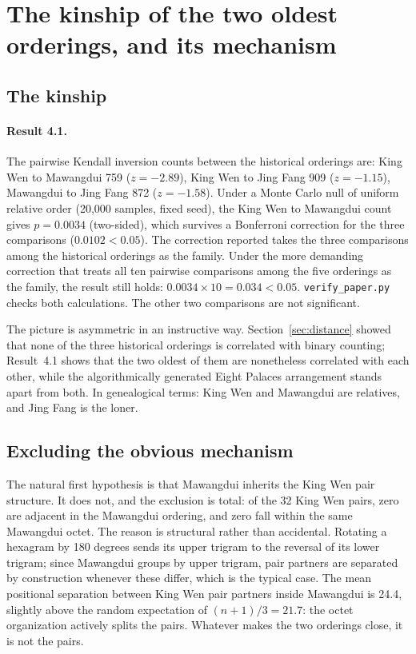 \documentclass[11pt]{article}
\begin{document}
\section{The kinship of the two oldest orderings, and its mechanism}
\label{sec:kinship}

\subsection{The kinship}

\paragraph{Result 4.1.} The pairwise Kendall inversion counts between the historical orderings are: King Wen to Mawangdui 759 ($z = -2.89$), King Wen to Jing Fang 909 ($z = -1.15$), Mawangdui to Jing Fang 872 ($z = -1.58$). Under a Monte Carlo null of uniform relative order (20,000 samples, fixed seed), the King Wen to Mawangdui count gives $p = 0.0034$ (two-sided), which survives a Bonferroni correction for the three comparisons ($0.0102 < 0.05$). The correction reported takes the three comparisons among the historical orderings as the family. Under the more demanding correction that treats all ten pairwise comparisons among the five orderings as the family, the result still holds: $0.0034 \times 10 = 0.034 < 0.05$. \texttt{verify\_paper.py} checks both calculations. The other two comparisons are not significant.

The picture is asymmetric in an instructive way. Section~\ref{sec:distance} showed that none of the three historical orderings is correlated with binary counting; Result~4.1 shows that the two oldest of them are nonetheless correlated with each other, while the algorithmically generated Eight Palaces arrangement stands apart from both. In genealogical terms: King Wen and Mawangdui are relatives, and Jing Fang is the loner.

\subsection{Excluding the obvious mechanism}

The natural first hypothesis is that Mawangdui inherits the King Wen pair structure. It does not, and the exclusion is total: of the 32 King Wen pairs, zero are adjacent in the Mawangdui ordering, and zero fall within the same Mawangdui octet. The reason is structural rather than accidental. Rotating a hexagram by 180 degrees sends its upper trigram to the reversal of its lower trigram; since Mawangdui groups by upper trigram, pair partners are separated by construction whenever these differ, which is the typical case. The mean positional separation between King Wen pair partners inside Mawangdui is 24.4, slightly above the random expectation of $(n + 1)/3 = 21.7$: the octet organization actively splits the pairs. Whatever makes the two orderings close, it is not the pairs.
\end{document}
